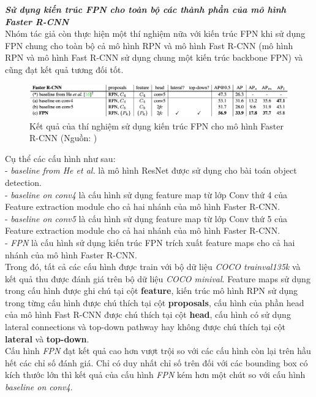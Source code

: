 {    \noindent
    \textbf{\textit{Sử dụng kiến trúc FPN cho toàn bộ các thành phần của mô hình Faster R-CNN}} \\
    Nhóm tác giả còn thực hiện một thí nghiệm nữa với kiến trúc FPN khi sử dụng FPN chung cho toàn bộ cả mô hình RPN và mô hình Fast R-CNN (mô hình RPN và mô hình Fast R-CNN sử dụng chung một kiến trúc backbone FPN) và cũng đạt kết quả tương đối tốt.

    \begin{figure}[H]
        \centering
        \includegraphics[width=12cm] {images/fpn_results_3}
        \caption{Kết quả của thí nghiệm sử dụng kiến trúc FPN cho mô hình Faster R-CNN (Nguồn: \cite{lin2017feature})}
        \label{fig:fpn_results_3}
    \end{figure}

    \noindent
    Cụ thể các cấu hình như sau: \\
    - \textit{baseline from He et al.} là mô hình ResNet được sử dụng cho bài toán object detection. \\
    - \textit{baseline on conv4} là cấu hình sử dụng feature map từ lớp Conv thứ 4 của Feature extraction module cho cả hai nhánh của mô hình Faster R-CNN. \\
    - \textit{baseline on conv5} là cấu hình sử dụng feature map từ lớp Conv thứ 5 của Feature extraction module cho cả hai nhánh của mô hình Faster R-CNN. \\
    - \textit{FPN} là cấu hình sử dụng kiến trúc FPN trích xuất feature maps cho cả hai nhánh của mô hình Faster R-CNN. \\
    Trong đó, tất cả các cấu hình được train với bộ dữ liệu \textit{COCO trainval135k} và kết quả thu được đánh giá trên bộ dữ liệu \textit{COCO minival}.
    Feature maps sử dụng trong cấu hình được ghi chú tại cột \textbf{feature}, kiến trúc mô hình RPN sử dụng trong từng cấu hình được chú thích tại cột \textbf{proposals}, cấu hình của phần head của mô hình Fast R-CNN được chú thích tại cột \textbf{head}, cấu hình có sử dụng lateral connections và top-down pathway hay không được chú thích tại cột \textbf{lateral} và \textbf{top-down}. \\
    Cấu hình \textit{FPN} đạt kết quả cao hơn vượt trội so với các cấu hình còn lại trên hầu hết các chỉ số đánh giá.
    Chỉ có duy nhất chỉ số trên đối với các bounding box có kích thước lớn thì kết quả của cấu hình \textit{FPN} kém hơn một chút so với cấu hình \textit{baseline on conv4}.

}
